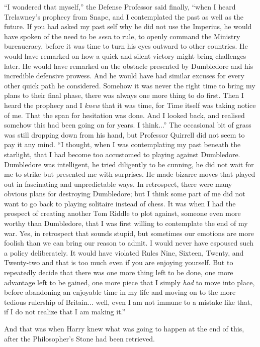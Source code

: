 ``I wondered that myself,'' the Defense Professor said finally, ``when I heard Trelawney's prophecy from Snape, and I contemplated the past as well as the future. If you had asked my past self why he did not use the Imperius, he would have spoken of the need to be \emph{seen} to rule, to openly command the Ministry bureaucracy, before it was time to turn his eyes outward to other countries. He would have remarked on how a quick and silent victory might bring challenges later. He would have remarked on the obstacle presented by Dumbledore and his incredible defensive prowess. And he would have had similar excuses for every other quick path he considered. Somehow it was never the right time to bring my plans to their final phase, there was always one more thing to do first. Then I heard the prophecy and I \emph{knew} that it was time, for Time itself was taking notice of me. That the span for hesitation was done. And I looked back, and realised somehow this had been going on for years. I think...'' The occasional bit of grass was still dropping down from his hand, but Professor Quirrell did not seem to pay it any mind. ``I thought, when I was contemplating my past beneath the starlight, that I had become too accustomed to playing against Dumbledore. Dumbledore was intelligent, he tried diligently to be cunning, he did not wait for me to strike but presented me with surprises. He made bizarre moves that played out in fascinating and unpredictable ways. In retrospect, there were many obvious plans for destroying Dumbledore; but I think some part of me did not want to go back to playing solitaire instead of chess. It was when I had the prospect of creating another Tom Riddle to plot against, someone even more worthy than Dumbledore, that I was first willing to contemplate the end of my war. Yes, in retrospect that sounds stupid, but sometimes our emotions are more foolish than we can bring our reason to admit. I would never have espoused such a policy deliberately. It would have violated Rules Nine, Sixteen, Twenty, and Twenty-two and that is too much even if you are enjoying yourself. But to repeatedly decide that there was one more thing left to be done, one more advantage left to be gained, one more piece that I simply \emph{had} to move into place, before abandoning an enjoyable time in my life and moving on to the more tedious rulership of Britain... well, even I am not immune to a mistake like that, if I do not realize that I am making it.''

And that was when Harry knew what was going to happen at the end of this, after the Philosopher's Stone had been retrieved.

